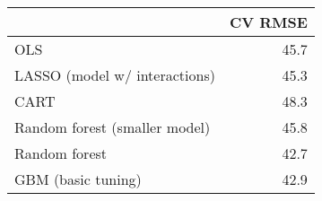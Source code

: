 
\begin{tabular}{lr}
\toprule
  & CV RMSE\\
\midrule
OLS & 45.7\\
LASSO (model w/ interactions) & 45.3\\
CART & 48.3\\
Random forest (smaller model) & 45.8\\
Random forest & 42.7\\
GBM (basic tuning) & 42.9\\
\bottomrule
\end{tabular}